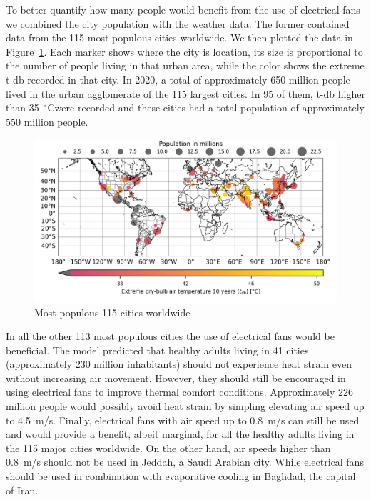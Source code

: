 To better quantify how many people would benefit from the use of electrical fans we combined the city population with the weather data.
The former contained data from the 115 most populous cities worldwide.
We then plotted the data in Figure~\ref{fig:map-population-temperature}.
Each marker shows where the city is location, its size is proportional to the number of people living in that urban area, while the color shows the extreme \ac{t-db} recorded in that city.
In 2020, a total of approximately 650 million people lived in the urban agglomerate of the 115 largest cities.
In 95 of them, \ac{t-db} higher than 35~$^{\circ}$C\@ were recorded and these cities had a total population of approximately 550 million people.

\begin{figure}[thb!]
    \centering
    \includegraphics[width=\textwidth]{figures/map-population-temperature}
    \caption{Most populous 115 cities worldwide}
    \label{fig:map-population-temperature}
\end{figure}

In all the other 113 most populous cities the use of electrical fans would be beneficial.
The  model predicted that healthy adults living in 41 cities (approximately 230 million inhabitants) should not experience heat strain even without increasing air movement.
However, they should still be encouraged in using electrical fans to improve thermal comfort conditions.
Approximately 226 million people would possibly avoid heat strain by simpling elevating air speed up to 4.5~m/s.
Finally, electrical fans with air speed up to 0.8~m/s can still be used and would provide a benefit, albeit marginal, for all the healthy adults living in the 115 major cities worldwide.
On the other hand, air speeds higher than 0.8~m/s should not be used in Jeddah, a Saudi Arabian city.
While electrical fans should be used in combination with evaporative cooling in Baghdad, the capital of Iran.

